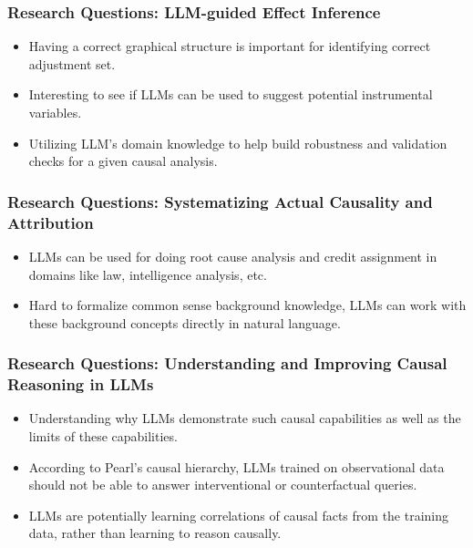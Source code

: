 \documentclass{beamer}
\begin{document}
\begin{frame}
	\frametitle{Research Questions: LLM-guided Effect Inference}
	\begin{itemize}
		\item Having a correct graphical structure is important for identifying
			correct adjustment set.
		\item Interesting to see if LLMs can be used to suggest
			potential instrumental variables.
		\item Utilizing LLM's domain knowledge to help build robustness
			and validation checks for a given causal analysis.
	\end{itemize}
\end{frame}

\begin{frame}
	\frametitle{Research Questions: Systematizing Actual Causality and Attribution}
	\begin{itemize}
		\item LLMs can be used for doing root cause analysis and
			credit assignment in domains like law, intelligence analysis, etc.
		\item Hard to formalize common sense background knowledge, LLMs can
			work with these background concepts directly in natural
			language.
	\end{itemize}
\end{frame}

\begin{frame}
	\frametitle{Research Questions: Understanding and Improving Causal Reasoning in LLMs}
	\begin{itemize}
		\item Understanding why LLMs demonstrate such causal capabilities
			as well as the limits of these capabilities. 
		\item According to Pearl's causal hierarchy, LLMs trained on
			observational data should not be able to answer
			interventional or counterfactual queries.
		\item LLMs are potentially learning correlations
			of causal facts from the training data, rather than learning
			to reason causally.
	\end{itemize}
\end{frame}
\end{document}

